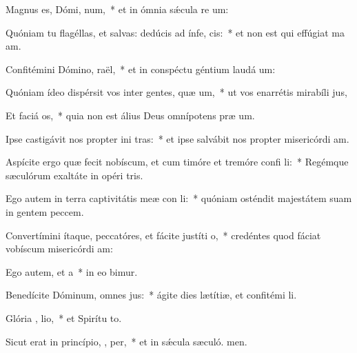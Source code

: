 \item Magnus es, Dómi,  num,~* et in ómnia sǽcula re um:
\item Quóniam tu flagéllas, et salvas: dedúcis ad ínfe,  cis:~* et non est qui effúgiat ma am.
\item Confitémini Dómino,  raël,~* et in conspéctu géntium laudá um:
\item Quóniam ídeo dispérsit vos inter gentes, quæ  um,~* ut vos enarrétis mirabíli jus,
\item Et faciá  os,~* quia non est álius Deus omnípotens præ um.
\item Ipse castigávit nos propter ini tras:~* et ipse salvábit nos propter misericórdi am.
\item Aspícite ergo quæ fecit nobíscum, et cum timóre et tremóre confi li:~* Regémque sæculórum exaltáte in opéri tris.
\item Ego autem in terra captivitátis meæ con li:~* quóniam osténdit majestátem suam in gentem peccem.
\item Convertímini ítaque, peccatóres, et fácite justíti  o,~* credéntes quod fáciat vobíscum misericórdi am:
\item Ego autem, et  a~* in eo bimur.
\item Benedícite Dóminum, omnes  jus:~* ágite dies lætítiæ, et confitémi li.
\item Glória ,  lio,~* et Spirítu to.
\item Sicut erat in princípio,  ,  per,~* et in sǽcula sæculó. men.
